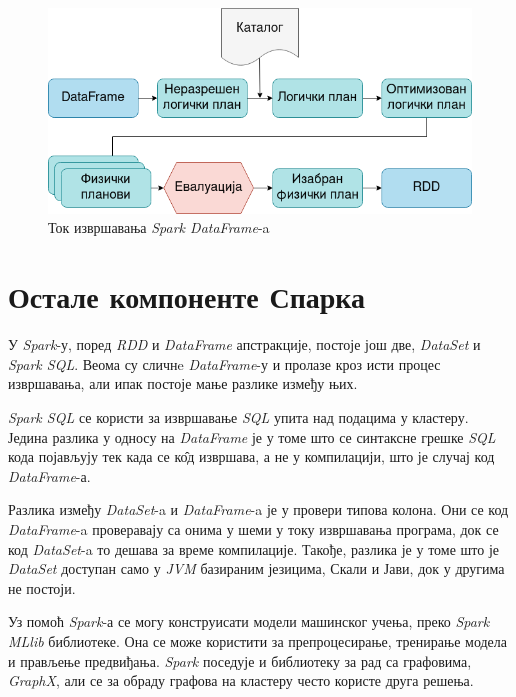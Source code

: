 \documentclass[12pt,oneside]{memoir}
\begin{document}
\begin{figure}[!ht]
  \centering
  \includegraphics[width=1\textwidth]{pictures/dataframe_optimization.png}
  \caption{Ток извршавања \textit{Spark DataFrame}-a}
  \label{fig:sprk_ex_plns}
\end{figure}

\section{Остале компоненте Спарка}
\label{sec:spark_components}

У \textit{Spark}-у, поред \textit{RDD} и \textit{DataFrame} апстракције, постоје још две, \textit{DataSet} и \textit{Spark SQL}. Веома су сличнe \textit{DataFrame}-у и пролазе кроз исти процес извршавања, али ипак постоје мање разлике између њих. \cite{spark_guide} 

\textit{Spark SQL} се користи за извршавање \textit{SQL} упита над подацима у кластеру. Једина разлика у односу на \textit{DataFrame} је у томе што се синтаксне грешке \textit{SQL} кода појављују тек када се к\^{о}д извршава, а не у компилацији, што је случај код \textit{DataFrame}-а. \cite{spark_guide}

Разлика између \textit{DataSet}-a и \textit{DataFrame}-a је у провери типова колона. Они се код \textit{DataFrame}-a проверавају са онима у шеми у току извршавања програма, док се код \textit{DataSet}-a то дешава за време компилације. Такође, разлика је у томе што је \textit{DataSet} доступан само у \textit{JVM} базираним језицима, Скали и Јави, док у другима не постоји. \cite{spark_guide}

Уз помоћ \textit{Spark}-а се могу конструисати модели машинског учења, преко \textit{Spark MLlib} библиотеке. Она се може користити за препроцесирање, тренирање модела и прављење предвиђања. \textit{Spark} поседује и библиотеку за рад са графовима, \textit{GraphX}, али се за обраду графова на кластеру често користе друга решења. \cite{spark_guide}
\end{document}
